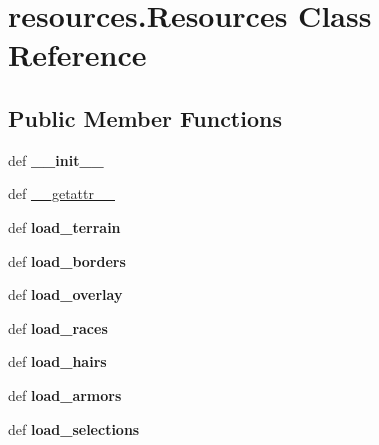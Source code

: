 \hypertarget{classresources_1_1Resources}{\section{resources.\-Resources Class Reference}
\label{classresources_1_1Resources}
}
\subsection*{Public Member Functions}
\begin{DoxyCompactItemize}
\item 
\hypertarget{classresources_1_1Resources_a2aabcfb36634c07af118d5fe5fa2e009}{def {\bfseries \-\_\-\-\_\-init\-\_\-\-\_\-}}\label{classresources_1_1Resources_a2aabcfb36634c07af118d5fe5fa2e009}

\item 
def \hyperlink{classresources_1_1Resources_abf7e7fb914c4ba0d2095d70e341d6948}{\-\_\-\-\_\-getattr\-\_\-\-\_\-}
\item 
\hypertarget{classresources_1_1Resources_a3546aae7176af2e95c28f404f1c12ae9}{def {\bfseries load\-\_\-terrain}}\label{classresources_1_1Resources_a3546aae7176af2e95c28f404f1c12ae9}

\item 
\hypertarget{classresources_1_1Resources_a90d0bcd2f246ea1e9652e9d813ef5a55}{def {\bfseries load\-\_\-borders}}\label{classresources_1_1Resources_a90d0bcd2f246ea1e9652e9d813ef5a55}

\item 
\hypertarget{classresources_1_1Resources_a64307afecc67686d66fa0c059cd391d1}{def {\bfseries load\-\_\-overlay}}\label{classresources_1_1Resources_a64307afecc67686d66fa0c059cd391d1}

\item 
\hypertarget{classresources_1_1Resources_a9d79d7aab8f24d3db384e32a6e8c655c}{def {\bfseries load\-\_\-races}}\label{classresources_1_1Resources_a9d79d7aab8f24d3db384e32a6e8c655c}

\item 
\hypertarget{classresources_1_1Resources_aad65c15722e1d849a2c8aff4bfb1e0d9}{def {\bfseries load\-\_\-hairs}}\label{classresources_1_1Resources_aad65c15722e1d849a2c8aff4bfb1e0d9}

\item 
\hypertarget{classresources_1_1Resources_a6c87bd0afb783b66ea07b69d9a9a82bd}{def {\bfseries load\-\_\-armors}}\label{classresources_1_1Resources_a6c87bd0afb783b66ea07b69d9a9a82bd}

\item 
\hypertarget{classresources_1_1Resources_a2f1ed4db8d10e704f617e52e8f573281}{def {\bfseries load\-\_\-selections}}\label{classresources_1_1Resources_a2f1ed4db8d10e704f617e52e8f573281}

\end{DoxyCompactItemize}
